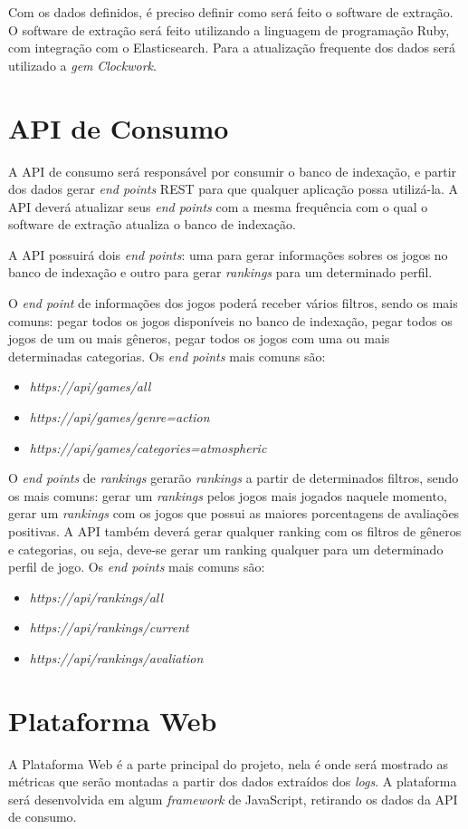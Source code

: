 Com os dados definidos, é preciso definir como será feito o software de extração. O software de extração será feito utilizando a linguagem de programação Ruby, com integração com o Elasticsearch. Para a atualização frequente dos dados será utilizado a \textit{gem} \textit{Clockwork}.
\section{API de Consumo}
A API de consumo será responsável por consumir o banco de indexação, e partir dos dados gerar \textit{end points} REST para que qualquer aplicação possa utilizá-la. A API deverá atualizar seus \textit{end points} com a mesma frequência com o qual o software de extração atualiza o banco de indexação.

A API possuirá dois \textit{end points}: uma para gerar informações sobres os jogos no banco de indexação e outro para gerar \textit{rankings} para um determinado perfil.

O \textit{end point} de informações dos jogos poderá receber vários filtros, sendo os mais comuns: pegar todos os jogos disponíveis no banco de indexação, pegar todos os jogos de um ou mais gêneros, pegar todos os jogos com uma ou mais determinadas categorias. Os \textit{end points} mais comuns são:
\begin{itemize}
	\item \textit{https://api/games/all}
	\item \textit{https://api/games/genre=action}
	\item \textit{https://api/games/categories=atmospheric}
\end{itemize}
O \textit{end points} de \textit{rankings} gerarão \textit{rankings} a partir de determinados filtros, sendo os mais comuns: gerar um \textit{rankings} pelos jogos mais jogados naquele momento, gerar um \textit{rankings} com os jogos que possui as maiores porcentagens de avaliações positivas. A API também deverá gerar qualquer ranking com os filtros de gêneros e categorias, ou seja, deve-se gerar um ranking qualquer para um determinado perfil de jogo. Os \textit{end points} mais comuns são:
\begin{itemize}
	\item \textit{https://api/rankings/all}
	\item \textit{https://api/rankings/current}
	\item \textit{https://api/rankings/avaliation}
\end{itemize}
\section{Plataforma Web}
A Plataforma Web é a parte principal do projeto, nela é onde será mostrado as métricas que serão montadas a partir dos dados extraídos dos \textit{logs}. A plataforma será desenvolvida em algum \textit{framework} de JavaScript, retirando os dados da API de consumo.

